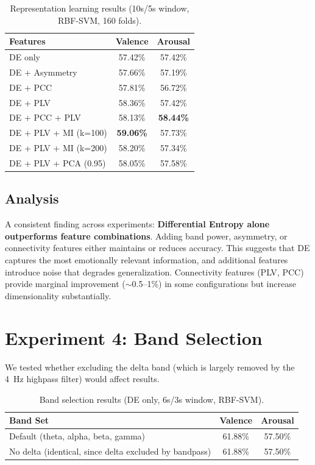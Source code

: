 \documentclass[12pt,a4paper]{report}
\begin{document}
\begin{table}[H]
\centering
\caption{Representation learning results (10s/5s window, RBF-SVM, 160 folds).}
\label{tab:repr_learning}
\begin{tabular}{lcc}
\toprule
\textbf{Features} & \textbf{Valence} & \textbf{Arousal} \\
\midrule
DE only              & 57.42\% & 57.42\% \\
DE + Asymmetry       & 57.66\% & 57.19\% \\
DE + PCC             & 57.81\% & 56.72\% \\
DE + PLV             & 58.36\% & 57.42\% \\
DE + PCC + PLV       & 58.13\% & \textbf{58.44\%} \\
DE + PLV + MI (k=100) & \textbf{59.06\%} & 57.73\% \\
DE + PLV + MI (k=200) & 58.20\% & 57.34\% \\
DE + PLV + PCA (0.95) & 58.05\% & 57.58\% \\
\bottomrule
\end{tabular}
\end{table}

\subsection{Analysis}

A consistent finding across experiments: \textbf{Differential Entropy alone
outperforms feature combinations}. Adding band power, asymmetry, or
connectivity features either maintains or reduces accuracy. This suggests
that DE captures the most emotionally relevant information, and additional
features introduce noise that degrades generalization. Connectivity features
(PLV, PCC) provide marginal improvement ($\sim$0.5--1\%) in some
configurations but increase dimensionality substantially.


\section{Experiment 4: Band Selection}
\label{sec:exp_bands}

We tested whether excluding the delta band (which is largely removed by the
4~Hz highpass filter) would affect results.

\begin{table}[H]
\centering
\caption{Band selection results (DE only, 6s/3s window, RBF-SVM).}
\label{tab:band_selection}
\begin{tabular}{lcc}
\toprule
\textbf{Band Set} & \textbf{Valence} & \textbf{Arousal} \\
\midrule
Default (theta, alpha, beta, gamma) & 61.88\% & 57.50\% \\
No delta (identical, since delta excluded by bandpass) & 61.88\% & 57.50\% \\
\bottomrule
\end{tabular}
\end{table}
\end{document}
